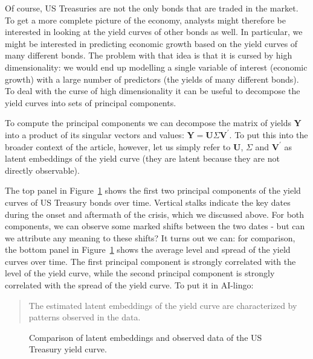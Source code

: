 \documentclass{article}
\theoremstyle{plain}
\theoremstyle{definition}
\theoremstyle{remark}
\begin{document}
Of course, US Treasuries are not the only bonds that are traded in the
market. To get a more complete picture of the economy, analysts might
therefore be interested in looking at the yield curves of other bonds as
well. In particular, we might be interested in predicting economic
growth based on the yield curves of many different bonds. The problem
with that idea is that it is cursed by high dimensionality: we would end
up modelling a single variable of interest (economic growth) with a
large number of predictors (the yields of many different bonds). To deal
with the curse of high dimensionality it can be useful to decompose the
yield curves into sets of principal components.

To compute the principal components we can decompose the matrix of yields \(\mathbf{Y}\) into a product of its singular vectors and values: \(\mathbf{Y}=\mathbf{U}\Sigma\mathbf{V}^{\prime}\). To put this into the broader context of the article, however, let us simply refer to \(\mathbf{U}\), \(\Sigma\) and \(\mathbf{V}^{\prime}\) as latent embeddings of the yield curve (they are latent because they are not directly observable).

The top panel in Figure~\ref{fig-pca} shows the first two principal
components of the yield curves of US Treasury bonds over time. Vertical
stalks indicate the key dates during the onset and aftermath of the
crisis, which we discussed above. For both components, we can observe
some marked shifts between the two dates - but can we attribute any
meaning to these shifts? It turns out we can: for comparison, the bottom
panel in Figure~\ref{fig-pca} shows the average level and spread of the
yield curves over time. The first principal component is strongly
correlated with the level of the yield curve, while the second principal
component is strongly correlated with the spread of the yield curve. To
put it in AI-lingo:

\begin{quote}
The estimated latent embeddings of the yield curve are characterized by
patterns observed in the data.
\end{quote}

\begin{figure}


\caption{\label{fig-pca}Comparison of latent embeddings and observed
data of the US Treasury yield curve.}

\end{figure}%
\end{document}
